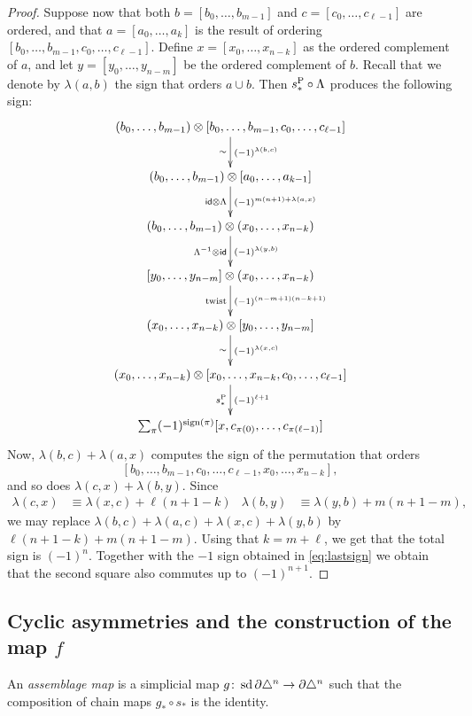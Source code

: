 \begin{proof}
	Suppose now that both $b=[b_0,\ldots,b_{m-1}]$ and $c=[c_0,\ldots,c_{\ell-1}]$ are ordered, and that $a = [a_0,\ldots,a_k]$ is the result of ordering $[b_0,\ldots,b_{m-1},c_0,\ldots,c_{\ell-1}]$. Define $x=[x_0,\ldots,x_{n-k}]$ as the ordered complement of $a$, and let $y=[y_0,\ldots,y_{n-m}]$ be the ordered complement of $b$. Recall that we denote by $\lambda(a,b)$ the sign that orders $a\cup b$. Then $s_*^{\operatorname{P}}\circ \Lambda$ produces the following sign:
	\[
	\xymatrix{
		(b_0,\ldots,b_{m-1})\otimes [b_0,\ldots,b_{m-1},c_0,\ldots,c_{\ell-1}]
		\ar[d]^-{(-1)^{\lambda(b,c)}}_-{\sim}
		\\
		(b_0,\ldots,b_{m-1})\otimes [a_0,\ldots,a_{k-1}]
		\ar[d]^{(-1)^{m(n+1)+\lambda(a,x)}}_{\id\otimes \Lambda}
		\\
		(b_0,\ldots,b_{m-1})\otimes (x_0,\ldots,x_{n-k})
		\ar[d]^-{(-1)^{\lambda(y,b)}}_-{\Lambda^{-1}\otimes \id}
		\\
		[y_0,\ldots,y_{n-m}]\otimes (x_0,\ldots,x_{n-k})
		\ar[d]^-{(-1)^{(n-m+1)(n-k+1)}}_-{\twist}
		\\
		(x_0,\ldots,x_{n-k})\otimes [y_0,\ldots,y_{n-m}]
		\ar[d]^-{(-1)^{\lambda(x,c)}}_-{\sim}
		\\
		(x_0,\ldots,x_{n-k})\otimes [x_0,\ldots,x_{n-k},c_0,\ldots,c_{\ell-1}]
		\ar[d]^-{(-1)^{\ell+1}}_-{s_*^{\Psd}}
		\\
		\sum_{\perm} (-1)^{\sign{\perm}}[x,c_{\perm(0)},\ldots,c_{\perm(\ell-1)}]
	}
	\]
	Now, $\lambda(b,c) + \lambda(a,x)$ computes the sign of the permutation that orders
	\[
	[b_0,\ldots,b_{m-1},c_0,\ldots,c_{\ell-1},x_{0},\ldots,x_{n-k}],
	\]
	and so does $\lambda(c,x)+\lambda(b,y)$. Since
	\begin{align*}
		\lambda(c,x) &\equiv \lambda(x,c) + \ell(n+1-k)
		&
		\lambda(b,y) &\equiv \lambda(y,b) + m(n+1-m),
	\end{align*}
	we may replace $\lambda(b,c)+\lambda(a,c) + \lambda(x,c) + \lambda(y,b)$ by $\ell(n+1-k)+m(n+1-m)$. Using that $k=m+\ell$, we get that the total sign is $(-1)^{n}$. Together with the $-1$ sign obtained in \eqref{eq:lastsign} we obtain that the second square also commutes up to $(-1)^{n+1}$.
\end{proof}

\subsection{Cyclic asymmetries and the construction of the map \texorpdfstring{$f$}{f}}

\begin{definition}
	An \emph{assemblage map} is a simplicial map $g\colon \operatorname{sd} \partial \triangle^n\to \partial \triangle^n$ such that the composition of chain maps $g_*\circ s_*$ is the identity.
\end{definition}


